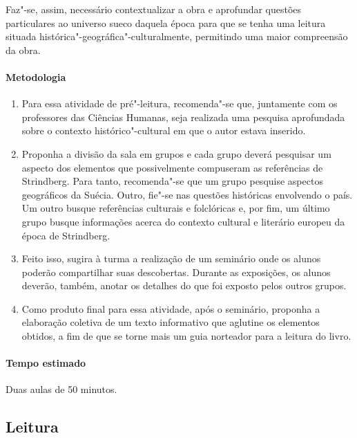 \documentclass[12pt]{extarticle}
\begin{document}
Faz"-se, assim, necessário contextualizar a obra e aprofundar questões 
particulares ao universo sueco daquela época para que se tenha uma leitura 
situada histórica"-geográfica"-culturalmente, permitindo uma maior 
compreensão da obra. 

\paragraph{Metodologia}

\begin{enumerate}

\item
Para essa atividade de pré"-leitura, recomenda"-se que, juntamente com 
os professores das Ciências Humanas, seja realizada uma pesquisa 
aprofundada sobre o contexto histórico"-cultural
em que o autor estava inserido. 

\item
Proponha a divisão da sala em grupos e cada grupo deverá pesquisar um 
aspecto dos elementos que possivelmente compuseram as referências de 
Strindberg. Para tanto, recomenda"-se que um grupo pesquise aspectos 
geográficos da Suécia. Outro, fie"-se nas questões históricas envolvendo 
o país. Um outro busque referências culturais e folclóricas e, por fim, 
um último grupo busque informações acerca do contexto cultural e literário 
europeu da época de Strindberg. 

\item
Feito isso, sugira à turma a realização de um seminário onde os
alunos poderão compartilhar suas descobertas. Durante as exposições, os 
alunos deverão, também, anotar os detalhes do que foi exposto pelos 
outros grupos.

\item
Como produto final para essa atividade, após o seminário, proponha 
a elaboração coletiva de um texto informativo que aglutine os elementos 
obtidos, a fim de que se torne mais um guia norteador para a leitura do 
livro.

\end{enumerate}

\paragraph{Tempo estimado} Duas aulas de 50 minutos.


\subsection{Leitura}
\end{document}
